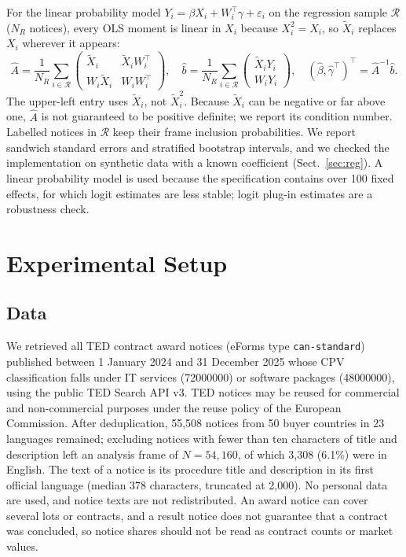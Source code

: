 \documentclass[runningheads]{llncs}
\begin{document}
For the linear probability model $Y_i=\beta X_i+W_i^\top\gamma+\varepsilon_i$ on the regression sample $\mathcal{R}$ ($N_R$ notices), every OLS moment is linear in $X_i$ because $X_i^2=X_i$, so $\tilde{X}_i$ replaces $X_i$ wherever it appears:
\begin{equation}
\hat{A}=\frac{1}{N_R}\sum_{i\in\mathcal{R}}\begin{pmatrix}\tilde{X}_i & \tilde{X}_iW_i^\top\\ W_i\tilde{X}_i & W_iW_i^\top\end{pmatrix},\quad
\hat{b}=\frac{1}{N_R}\sum_{i\in\mathcal{R}}\begin{pmatrix}\tilde{X}_iY_i\\ W_iY_i\end{pmatrix},\quad
(\hat\beta,\hat\gamma^\top)^\top=\hat{A}^{-1}\hat{b}.
\label{eq:moments}
\end{equation}
The upper-left entry uses $\tilde{X}_i$, not $\tilde{X}_i^2$. Because $\tilde{X}_i$ can be negative or far above one, $\hat{A}$ is not guaranteed to be positive definite; we report its condition number. Labelled notices in $\mathcal{R}$ keep their frame inclusion probabilities. We report sandwich standard errors and stratified bootstrap intervals, and we checked the implementation on synthetic data with a known coefficient (Sect.~\ref{sec:reg}). A linear probability model is used because the specification contains over 100 fixed effects, for which logit estimates are less stable; logit plug-in estimates are a robustness check.

\section{Experimental Setup}
\subsection{Data}
We retrieved all TED contract award notices (eForms type \texttt{can-standard}) published between 1 January 2024 and 31 December 2025 whose CPV classification falls under IT services (72000000) or software packages (48000000), using the public TED Search API v3. TED notices may be reused for commercial and non-commercial purposes under the reuse policy of the European Commission. After deduplication, %
55,508 notices from 50 buyer countries in 23 languages remained; excluding notices with fewer than ten characters of title and description left an analysis frame of $N=54{,}160$, of which 3,308 (6.1\%) were in English. The text of a notice is its procedure title and description in its first official language (median 378 characters, truncated at 2,000). No personal data are used, and notice texts are not redistributed. An award notice can cover several lots or contracts, and a result notice does not guarantee that a contract was concluded, so notice shares should not be read as contract counts or market values.
\end{document}
